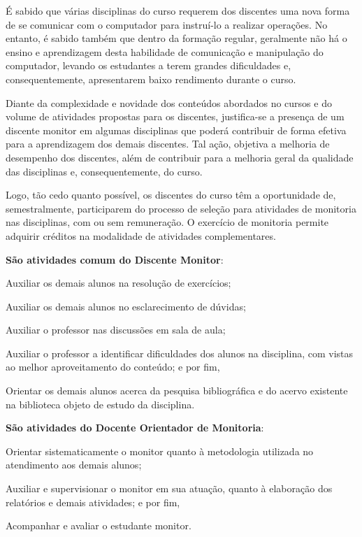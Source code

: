 \documentclass[
	12pt,				%
	openright,			%
	twoside,			%
	a4paper,			%
	chapter=TITLE,		%
	english,			%
	french,				%
	spanish,			%
	brazil,				%
	]{abntex2}
\begin{document}
É sabido que várias disciplinas do curso  requerem dos discentes  uma nova forma de se comunicar com o computador para instruí-lo a realizar operações. No entanto, é sabido também que dentro da formação regular, geralmente não há o ensino e aprendizagem desta  habilidade de comunicação e manipulação do computador,  levando os estudantes a terem grandes dificuldades e, consequentemente, apresentarem baixo rendimento durante o curso.

Diante da complexidade e novidade dos conte\'udos abordados no cursos e do  volume de atividades propostas para os discentes, justifica-se a presen\c{c}a de um discente monitor em algumas disciplinas que poder\'a contribuir de forma efetiva para a aprendizagem dos demais discentes. Tal a\c{c}\~ao, objetiva a melhoria de  desempenho dos discentes, al\'em de contribuir para a melhoria geral da qualidade das disciplinas e, consequentemente, do curso. 

Logo, tão cedo quanto possível,  os discentes do curso têm a oportunidade de, semestralmente, participarem do processo de seleção para atividades de monitoria nas disciplinas, com ou sem remuneração. O exercício de monitoria permite adquirir créditos na modalidade de atividades complementares.


\textbf{São atividades comum do Discente Monitor}:
\begin{alineas}
\item Auxiliar os demais alunos na resolução de exercícios;
\item Auxiliar os demais alunos no esclarecimento de dúvidas;
\item Auxiliar o professor nas discussões em sala de aula;
\item Auxiliar o professor a identificar dificuldades dos alunos na disciplina, com vistas ao melhor aproveitamento do conteúdo; e por fim,
\item Orientar os demais alunos acerca da pesquisa bibliográfica e do acervo existente na biblioteca objeto de estudo da disciplina.

\end{alineas}


\textbf{São atividades do Docente Orientador de Monitoria}:
\begin{alineas}
\item Orientar sistematicamente o monitor quanto à metodologia utilizada no atendimento aos demais alunos;
\item Auxiliar e supervisionar o monitor em sua atuação, quanto à elaboração dos relatórios e demais atividades; e por fim,
\item Acompanhar e avaliar o estudante monitor.
\end{alineas}
\end{document}
